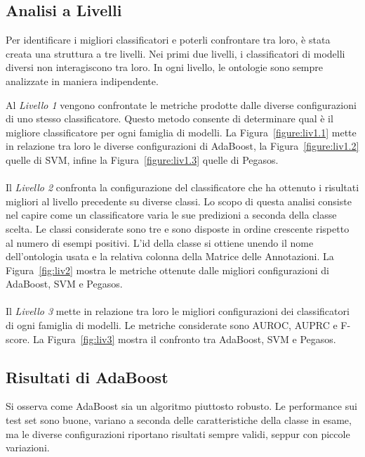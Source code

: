 \documentclass[12pt,a4paper,oneside,hidelinks]{report}
\begin{document}
\subsection{Analisi a Livelli}
Per identificare i migliori classificatori e poterli confrontare tra loro, è stata creata una struttura a tre livelli. Nei primi due livelli, i classificatori di modelli diversi non interagiscono tra loro. In ogni livello, le ontologie sono sempre analizzate in maniera indipendente. 

Al \textit{Livello 1} vengono confrontate le metriche prodotte dalle diverse configurazioni di uno stesso classificatore. Questo metodo consente di determinare qual è il migliore classificatore per ogni famiglia di modelli. La Figura~\ref{figure:liv1.1} mette in relazione tra loro le diverse configurazioni di AdaBoost, la Figura~\ref{figure:liv1.2} quelle di SVM, infine la Figura~\ref{figure:liv1.3} quelle di Pegasos.

\paragraph*{}
Il \textit{Livello 2} confronta la configurazione del classificatore che ha ottenuto i risultati migliori al livello precedente su diverse classi. Lo scopo di questa analisi consiste nel capire come un classificatore varia le sue predizioni a seconda della classe scelta. Le classi considerate sono tre e sono disposte in ordine crescente rispetto al numero di esempi positivi. L'id della classe si ottiene unendo il nome dell'ontologia usata e la relativa colonna della Matrice delle Annotazioni.
La Figura~\ref{fig:liv2} mostra le metriche ottenute dalle migliori configurazioni di AdaBoost, SVM e Pegasos.

\paragraph*{}
Il \textit{Livello 3} mette in relazione tra loro le migliori configurazioni dei classificatori di ogni famiglia di modelli. Le metriche considerate sono AUROC, AUPRC e F-score. La Figura~\ref{fig:liv3} mostra il confronto tra AdaBoost, SVM e Pegasos.

\subsection{Risultati di AdaBoost}
Si osserva come AdaBoost sia un algoritmo piuttosto robusto. Le performance sui test set sono buone, variano a seconda delle caratteristiche della classe in esame, ma le diverse configurazioni riportano risultati sempre validi, seppur con piccole variazioni.
\end{document}
